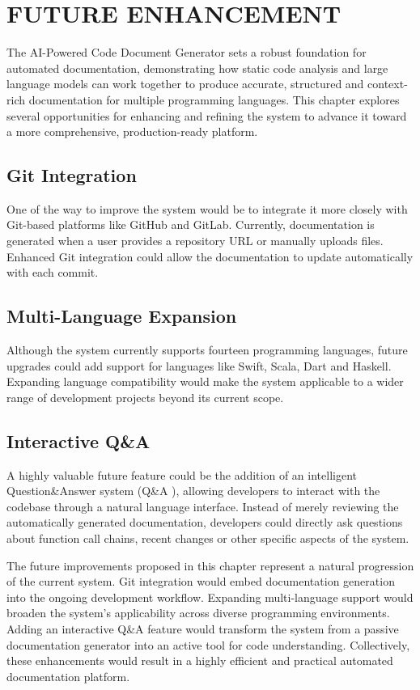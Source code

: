 \chapter{FUTURE ENHANCEMENT}

\hspace{0.5cm} The AI-Powered Code Document Generator sets a robust foundation for automated documentation, demonstrating how static code analysis and large language models can work together to produce accurate, structured and context-rich documentation for multiple programming languages. This chapter explores several opportunities for enhancing and refining the system to advance it toward a more comprehensive, production-ready platform.

\section{Git Integration}
\hspace{0.5cm} One of the way to improve the system would be to integrate it more closely with Git-based platforms like GitHub and GitLab. Currently, documentation is generated when a user provides a repository URL or manually uploads files. Enhanced Git integration could allow the documentation to update automatically with each commit.



\section{Multi-Language Expansion}
\hspace{0.5cm} Although the system currently supports fourteen programming languages, future upgrades could add support for languages like Swift, Scala, Dart and Haskell. Expanding language compatibility would make the system applicable to a wider range of development projects beyond its current scope.


\section{Interactive Q\&A}
\hspace{0.5cm} A highly valuable future feature could be the addition of an intelligent Question\&Answer system (Q\&A ), allowing developers to interact with the codebase through a natural language interface. Instead of merely reviewing the automatically generated documentation, developers could directly ask questions about function call chains, recent changes or other specific aspects of the system.


\newline
\hspace{0.5cm}The future improvements proposed in this chapter represent a natural progression of the current system. Git integration would embed documentation generation into the ongoing development workflow. Expanding multi-language support would broaden the system’s applicability across diverse programming environments. Adding an interactive Q\&A feature would transform the system from a passive documentation generator into an active tool for code understanding. Collectively, these enhancements would result in a highly efficient and practical automated documentation platform.